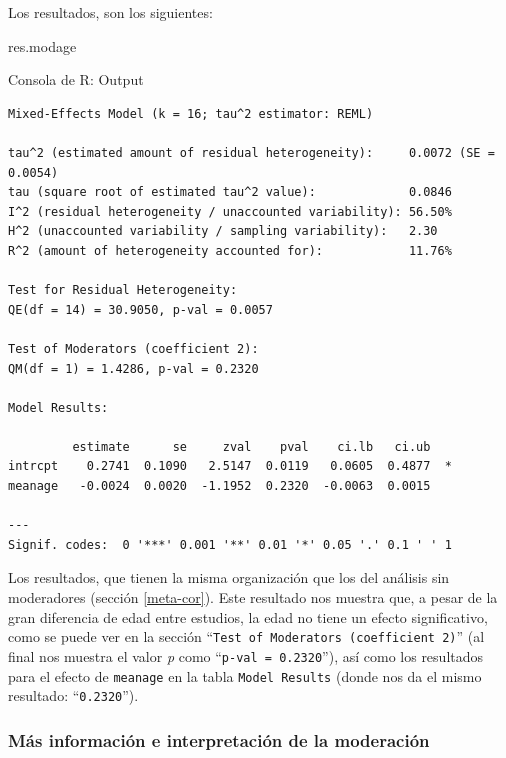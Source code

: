 \documentclass[
  bookmarksnumbered]{article}
\newenvironment{Shaded}{\begin{snugshade}}{\end{snugshade}}
\newcommand{\NormalTok}[1]{\textcolor[rgb]{0.12,0.11,0.11}{#1}}
\begin{document}
Los resultados, son los siguientes:

\begin{Shaded}
\begin{Highlighting}[]
\NormalTok{res.modage}
\end{Highlighting}
\end{Shaded}

\begin{ROut}{Consola de R: Output~\thetcbcounter}
                \begin{footnotesize}
                \begin{verbatim} 
Mixed-Effects Model (k = 16; tau^2 estimator: REML)

tau^2 (estimated amount of residual heterogeneity):     0.0072 (SE = 0.0054)
tau (square root of estimated tau^2 value):             0.0846
I^2 (residual heterogeneity / unaccounted variability): 56.50%
H^2 (unaccounted variability / sampling variability):   2.30
R^2 (amount of heterogeneity accounted for):            11.76%

Test for Residual Heterogeneity:
QE(df = 14) = 30.9050, p-val = 0.0057

Test of Moderators (coefficient 2):
QM(df = 1) = 1.4286, p-val = 0.2320

Model Results:

         estimate      se     zval    pval    ci.lb   ci.ub    
intrcpt    0.2741  0.1090   2.5147  0.0119   0.0605  0.4877  * 
meanage   -0.0024  0.0020  -1.1952  0.2320  -0.0063  0.0015    

---
Signif. codes:  0 '***' 0.001 '**' 0.01 '*' 0.05 '.' 0.1 ' ' 1
 \end{verbatim}
                \end{footnotesize}
                \end{ROut}

Los resultados, que tienen la misma organización que los del análisis sin moderadores (sección \ref{meta-cor}). Este resultado nos muestra que, a pesar de la gran diferencia de edad entre estudios, la edad no tiene un efecto significativo, como se puede ver en la sección ``\texttt{Test\ of\ Moderators\ (coefficient\ 2)}'' (al final nos muestra el valor \emph{p} como ``\texttt{p-val =  0.2320}''), así como los resultados para el efecto de \texttt{meanage} en la tabla \texttt{Model\ Results} (donde nos da el mismo resultado: ``\texttt{0.2320}'').

\hypertarget{pred-mods}{%
\subsubsection{Más información e interpretación de la moderación}\label{pred-mods}}
\end{document}
